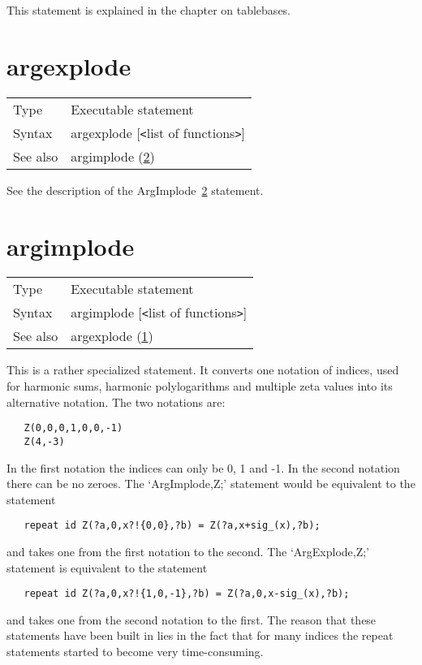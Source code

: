 \noindent This statement is explained in the chapter on 
tablebases.\vspace{10mm}


\section{argexplode}
\label{substaargexplode}

\noindent \begin{tabular}{ll}
Type & Executable statement\\
Syntax & argexplode [{\tt<}list of functions{\tt>}] \\
See also & argimplode (\ref{substaargimplode})
\end{tabular} \vspace{4mm}

\noindent See the description of the ArgImplode~\ref{substaargimplode} 
statement.
\vspace{10mm}


\section{argimplode}
\label{substaargimplode}

\noindent \begin{tabular}{ll}
Type & Executable statement\\
Syntax & argimplode [{\tt<}list of functions{\tt>}] \\
See also & argexplode (\ref{substaargexplode})
\end{tabular} \vspace{4mm}

\noindent This is a rather specialized statement. It converts one notation 
of indices, used for harmonic sums, harmonic 
polylogarithms and multiple zeta values into 
its alternative notation. The two notations are:
\begin{verbatim}
   Z(0,0,0,1,0,0,-1)
   Z(4,-3)
\end{verbatim}
In the first notation the indices can only be 0, 1 and -1. In the second 
notation there can be no zeroes. The `ArgImplode,Z;' 
statement would be 
equivalent to the statement
\begin{verbatim}
   repeat id Z(?a,0,x?!{0,0},?b) = Z(?a,x+sig_(x),?b);
\end{verbatim}
and takes one from the first notation to the second. The `ArgExplode,Z;' 
statement is equivalent to the statement
\begin{verbatim}
   repeat id Z(?a,0,x?!{1,0,-1},?b) = Z(?a,0,x-sig_(x),?b);
\end{verbatim}
and takes one from the second notation to the first. The reason that these 
statements have been built in lies in the fact that for many indices the 
repeat statements started to become very time-consuming.

